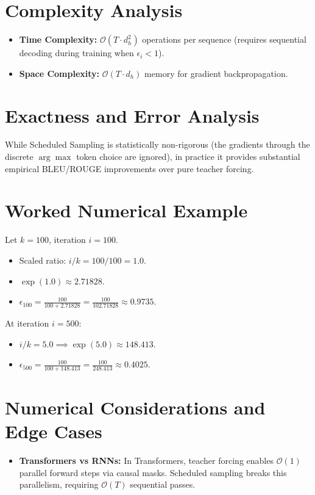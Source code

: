 \documentclass[11pt,a4paper]{article}
\theoremstyle{definition}
\begin{document}
\section{Complexity Analysis}

\begin{itemize}
    \item \textbf{Time Complexity:} $\mathcal{O}(T \cdot d_h^2)$ operations per sequence (requires sequential decoding during training when $\epsilon_i < 1$).
    \item \textbf{Space Complexity:} $\mathcal{O}(T \cdot d_h)$ memory for gradient backpropagation.
\end{itemize}

\section{Exactness and Error Analysis}

While Scheduled Sampling is statistically non-rigorous (the gradients through the discrete $\arg\max$ token choice are ignored), in practice it provides substantial empirical BLEU/ROUGE improvements over pure teacher forcing.

\section{Worked Numerical Example}

Let $k = 100$, iteration $i = 100$.
\begin{itemize}
    \item Scaled ratio: $i / k = 100 / 100 = 1.0$.
    \item $\exp(1.0) \approx 2.71828$.
    \item $\epsilon_{100} = \frac{100}{100 + 2.71828} = \frac{100}{102.71828} \approx 0.9735$.
\end{itemize}
At iteration $i=500$:
\begin{itemize}
    \item $i / k = 5.0 \implies \exp(5.0) \approx 148.413$.
    \item $\epsilon_{500} = \frac{100}{100 + 148.413} = \frac{100}{248.413} \approx 0.4025$.
\end{itemize}

\section{Numerical Considerations and Edge Cases}

\begin{itemize}
    \item \textbf{Transformers vs RNNs:} In Transformers, teacher forcing enables $\mathcal{O}(1)$ parallel forward steps via causal masks. Scheduled sampling breaks this parallelism, requiring $\mathcal{O}(T)$ sequential passes.
\end{itemize}
\end{document}
